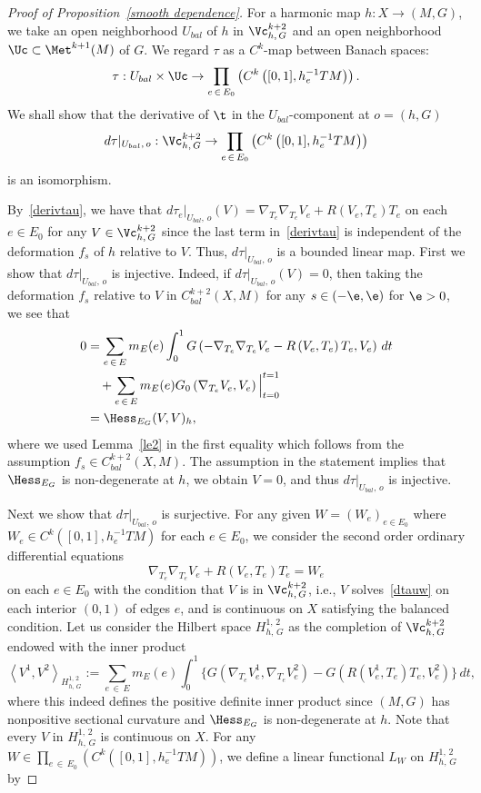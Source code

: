 \begin{proof}[Proof of Proposition~\ref{smooth dependence}]
For a harmonic map $h:X \to (M, G)$, we take an open neighborhood $U_{bal}$ of $h$ in $\Vc_{h,\,G}^{k+2}$ and an open neighborhood $\Uc\subset \Met^{k+1}(M)$ of $G$. We regard $\tau$ as a $C^k$-map between Banach spaces:
\[
\tau: U_{bal}\times \Uc\to \prod_{e\,\in\,E_0}\left(C^k\left([0, 1], h_e^{-1}TM\right)\right).
\]
We shall show that the derivative of $\t$ in the $U_{bal}$-component at $o=(h, G)$
\[
d\tau|_{U_{bal},\,o}: \Vc_{h,\,G}^{k+2}\to \prod_{e\,\in\,E_0}\left(C^k\left([0, 1], h_e^{-1}TM\right)\right)
\]
is an isomorphism.

By~\eqref{derivtau}, we have that $d\tau_e|_{U_{bal},\,o}(V)=\nabla_{T_e}\nabla_{T_e}V_e+R(V_e, T_e)T_e$ on each $e \in E_0$ for any $V\in \Vc_{h,\, G}^{k+2}$ since the last term in~\eqref{derivtau} is independent of the deformation $f_s$ of $h$ relative to $V$. Thus, $d\tau|_{U_{bal},\,o}$ is a bounded linear map. First we show that $d\tau|_{U_{bal},\,o}$ is injective. Indeed, if $d\tau|_{U_{bal},\,o}(V)=0$, then taking the deformation $f_s$ relative to $V$ in $C^{k+2}_{bal}(X, M)$ for any $s\in (-\e, \e)$ for $\e>0$, we see that
\begin{align*}
0&=\sum_{e\,\in\,E}m_E(e)\int_0^1 G\left(-\nabla_{T_e}\nabla_{T_e}V_e-R\left(V_e, T_e\right)T_e, V_e\right)\, dt\\
&\quad+\sum_{e\,\in\,E}m_E(e)G_0\left(\nabla_{T_e}V_e, V_e\right)\Big|_{t=0}^{t=1}\\
&={\Hess}_{E_G}(V,V)_h,
\end{align*}
where we used Lemma~\ref{le2} in the first equality which follows from the assumption $f_s\in C^{k+2}_{bal}(X,M)$. The assumption in the statement implies that ${\Hess}_{E_G}$ is non-degenerate at $h$, we obtain $V=0$, and thus $d\tau|_{U_{bal},\,o}$ is injective.

Next we show that $d\tau|_{U_{bal},\,o}$ is surjective. For any given $W=(W_e)_{e \in E_0}$ where $W_e \in C^k([0, 1], h_e^{-1}TM)$ for each $e \in E_0$, we consider the second order ordinary differential equations
\begin{equation}\label{dtauw}
\nabla_{T_e}\nabla_{T_e}V_e+R(V_e, T_e)T_e=W_e
\end{equation}
on each $e \in E_0$ with the condition that $V$ is in $\Vc_{h,\,G}^{k+2}$, i.e., $V$ solves~\eqref{dtauw} on each interior $(0, 1)$ of edges $e$, and is continuous on $X$ satisfying the balanced condition. Let us consider the Hilbert space $H^{1, \,2}_{h,\,G}$ as the completion of $\Vc_{h,\,G}^{k+2}$ endowed with the inner product
\[
\left\langle V^1, V^2\right\rangle_{H_{h,\,G}^{1,\,2}}:=\sum_{e \,\in\,E}m_E(e)\int_0^1\Big\{G\left(\nabla_{T_e}V_e^1, \nabla_{T_e}V_e^2\right)-G\left(R\left(V_e^1, T_e\right)T_e, V_e^2\right)\Big\}\,dt,
\]
where this indeed defines the positive definite inner product since $(M, G)$ has nonpositive sectional curvature and ${\Hess}_{E_G}$ is non-degenerate at $h$. Note that every $V$ in $H^{1,\,2}_{h,\,G}$ is continuous on $X$. For any $W \in \prod_{e\,\in\,E_0}(C^k([0, 1], h_e^{-1}TM))$, we define a linear functional $L_W$ on $H^{1,\,2}_{h,\, G}$ by


\end{proof}
